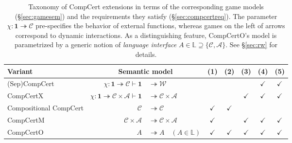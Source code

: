 \documentclass[draft,11pt]{report}
\begin{document}
\begin{table} %
  \small
  \begin{tabular}{l@{\qquad}r@{}l@{\qquad}c@{\:}c@{\:}c@{\:}c@{\:}c}
    \hline
    Variant & \multicolumn{2}{c}{Semantic model} & (1) & (2) & (3) & (4) & (5) \\
    \hline
    (Sep)CompCert \cite{compcert,sepcompcert} &
      $\chi : \mathbf{1} \twoheadrightarrow \mathcal{C}
      \vdash \mathbf{1} $ & ${} \twoheadrightarrow \mathcal{W}$ &
      & & & $\checkmark$ & $\checkmark$ \\
    CompCertX \cite{popl15} &
      \hspace{-1em}
      $\chi : \mathbf{1} \twoheadrightarrow \mathcal{C} \times \mathcal{A}
       \vdash
       \mathbf{1} $ & ${} \twoheadrightarrow \mathcal{C} \times \mathcal{A}$
      & & & $\checkmark$ & $\checkmark$ & $\checkmark$ \\
    Compositional CompCert \cite{compcompcert} &
      $\mathcal{C}$ & ${} \twoheadrightarrow \mathcal{C}$ &
      $\checkmark$ & $\checkmark$ & & & \\
    CompCertM \cite{compcertm} &
      $\mathcal{C} \times \mathcal{A} $ & ${}\twoheadrightarrow
       \mathcal{C} \times \mathcal{A}$ &
      $\checkmark$ & & $\checkmark$ & $\checkmark$ & $\checkmark$ \\
    CompCertO &
      $A $ & ${}\twoheadrightarrow A \quad
      (A \in \mathbb{L})$ &
      $\checkmark$&$\checkmark$&$\checkmark$&$\checkmark$&$\checkmark$ \\
    \hline
  \end{tabular}
  \caption{Taxonomy of CompCert extensions
    in terms of the corresponding game models (\S\ref{sec:gamesem})
    and the requirements they satisfy (\S\ref{sec:compcertreq}).
    The parameter $\chi : \mathbf{1} \twoheadrightarrow \mathcal{C}$
    pre-specifies the behavior of external functions,
    whereas games on the left of arrows
    correspond to dynamic interactions.
    As a distinguishing feature,
    CompCertO's model is parametrized by a generic notion of
    \emph{language interface}
    $A \in \mathbb{L} \supseteq \{\mathcal{C}, \mathcal{A}\}$.
    See \S\ref{sec:rw} for details.
  }
  \label{tbl:compcerts}
\end{table}
\end{document}
